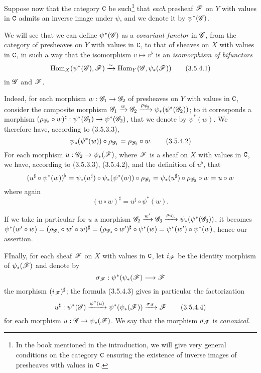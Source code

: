 \begin{env}[3.5.4]
\label{env-0.3.5.4}
Suppose now that the category $\mathtt{C}$ be such\footnote{In the book mentioned in the
introduction, we will give very general conditions on the category $\mathtt{C}$ ensuring
the existence of inverse images of presheaves with values in $\mathtt{C}$.} that
{\em each} presheaf $\mathscr{F}$ on $Y$ with values in $\mathtt{C}$ admits an inverse image
under $\psi$, and we denote it by $\psi^*(\mathscr{G})$.

We will see that we can define $\psi^*(\mathscr{G})$ as a {\em covariant functor} in
$\mathscr{G}$, from the category of presheaves on $Y$ with values in $\mathtt{C}$, to that of
sheaves on $X$ with values in $\mathtt{C}$, in such a way that the isomorphism
$v\mapsto v^\flat$ is an {\em isomorphism of bifunctors}
\[
  {\mathop{\mathrm{Hom}}\nolimits}_X(\psi^*(\mathscr{G}),\mathscr{F})\xrightarrow{\sim}{\mathop{\mathrm{Hom}}\nolimits}_Y(\mathscr{G},\psi_*(\mathscr{F}))
  \tag{3.5.4.1}
\]
in $\mathscr{G}$ and $\mathscr{F}$.

Indeed, for each morphism $w:\mathscr{G}_1\to\mathscr{G}_2$ of presheaves on $Y$ with
values in $\mathtt{C}$, consider the composite morphism
$\mathscr{G}_1\xrightarrow{w}\mathscr{G}_2
  \xrightarrow{\rho_{\mathscr{G}_2}}\psi_*(\psi^*(\mathscr{G}_2))$; to it corresponds a
morphism $(\rho_{\mathscr{G}_2}\circ w)^\sharp:\psi^*(\mathscr{G}_1)\to\psi^*(\mathscr{G}_2)$,
that we denote by $\psi^*(w)$. We therefore have, according to (3.5.3.3),
\[
  \psi_*(\psi^*(w))\circ\rho_{\mathscr{G}_1}=\rho_{\mathscr{G}_2}\circ w.
  \tag{3.5.4.2}
\]
For each morphism $u:\mathscr{G}_2\to\psi_*(\mathscr{F})$, where $\mathscr{F}$ is a sheaf on
$X$ with values in $\mathtt{C}$, we have, according to (3.5.3.3), (3.5.4.2), and the
definition of $u^\flat$, that
\[
  (u^\sharp\circ\psi^*(w))^\flat
  =\psi_*(u^\sharp)\circ\psi_*(\psi^*(w))\circ\rho_{\mathscr{G}_1}
  =\psi_*(u^\sharp)\circ\rho_{\mathscr{G}_2}\circ w=u\circ w
\]
where again
\[
  (u\circ w)^\sharp=u^\sharp\circ\psi^*(w).
  \tag{3.5.4.3}
\]

If we take in particular for $u$ a morphism
$\mathscr{G}_2\xrightarrow{w'}\mathscr{G}_3
  \xrightarrow{\rho_{\mathscr{G}_3}}\psi_*(\psi^*(\mathscr{G}_3))$, it becomes
$\psi^*(w'\circ w)=(\rho_{\mathscr{G}_3}\circ w'\circ w)^\sharp
  =(\rho_{\mathscr{G}_3}\circ w')^\sharp\circ\psi^*(w)=\psi^*(w')\circ\psi^*(w)$,
hence our assertion.

FInally, for each sheaf $\mathscr{F}$ on $X$ with values in $\mathtt{C}$, let $i_\mathscr{F}$ be
the identity morphism of $\psi_*(\mathscr{F})$ and denote by
\[
  \sigma_\mathscr{F}:\psi^*(\psi_*(\mathscr{F})\longrightarrow\mathscr{F}
\]
the morphism $(i_\mathscr{F})^\sharp$; the formula (3.5.4.3) gives in particular the
factorization
\[
  u^\sharp:\psi^*(\mathscr{G})\xrightarrow{\psi^*(u)}\psi^*(\psi_*(\mathscr{F}))
  \xrightarrow{\sigma_\mathscr{F}}\mathscr{F}
  \tag{3.5.4.4}
\]
for each morphism $u:\mathscr{G}\to\psi_*(\mathscr{F})$. We say that the morphism
$\sigma_\mathscr{F}$ is {\em canonical}.
\end{env}

